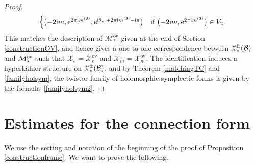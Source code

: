 \begin{proof}
\begin{equation*}
\begin{cases}
 \bigl(-2{\rm i}m,{\rm e}^{2\pi {\rm i} m^{(3)}},{\rm e}^{{\rm i}\theta_m +2\pi {\rm i} m^{(3)}-{\rm i}\pi}\bigr) &
 \text{if}\ \bigl(-2{\rm i}m,{\rm e}^{2\pi {\rm i} m^{(3)}}\bigr)\in V_2.
 \end{cases}
\end{equation*}
This matches the description of $\mathcal{M}^{\text{ov}}_*$ given at the end of Section \ref{constructionOV}, and hence gives a one-to-one correspondence between $\mathfrak{X}^{\textnormal{fr}}_*(\mathcal{B})$ and $\mathcal{M}^{\textnormal{ov}}_*$ such that $\mathcal{X}_e=\mathcal{X}_e^{\text{ov}}$ and $\mathcal{X}_m=\mathcal{X}_m^{\text{ov}}$. The identification induces a hyperk\"ahler structure on $\mathfrak{X}_*^{{\rm fr}}(\mathcal{B})$, and by Theorem \ref{matchingTC} and \eqref{familyholsym}, the twistor family of holomorphic symplectic forms is given by the formula~\eqref{familyholsym2}.
\end{proof}

\appendix\setcounter{section}{0}
\section{Estimates for the connection form}\label{AA}

We use the setting and notation of the beginning of the proof of Proposition \ref{constructionframe}. We want to prove the following.

